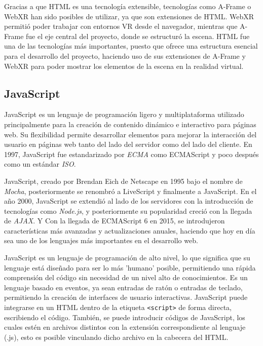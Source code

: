 \documentclass[a4paper, 12pt]{book}
\begin{document}
Gracias a que HTML es una tecnología extensible, tecnologías como A-Frame o WebXR han sido posibles de utilizar, ya que son extensiones de HTML. WebXR permitió poder trabajar con entornos VR desde el navegador, mientras que A-Frame fue el eje central 
del proyecto, donde se estructuró la escena. HTML fue una de las tecnologías más importantes, puesto que ofrece una estructura esencial para el desarrollo del proyecto, haciendo uso de sus extensiones de A-Frame y WebXR para poder mostrar los elementos de la escena en la realidad virtual.

\subsection{JavaScript}
\label{subsec:JavaScript}
JavaScript \cite{mdn2024} es un lenguaje de programación ligero y multiplataforma utilizado principalmente para la creación de contenido dinámico e interactivo para páginas web.
Su flexibilidad permite desarrollar elementos para mejorar la interacción del usuario en páginas web tanto del lado del servidor como del lado del cliente. En 1997, JavaScript fue estandarizado
por \textit{ECMA} como ECMAScript y poco después como un estándar \textit{ISO}.

JavaScript, creado por Brendan Eich de Netscape en 1995 bajo el nombre de \textit{Mocha}, posteriormente se renombró a LiveScript y finalmente a JavaScript.
En el año 2000, JavaScript se extendió al lado de los servidores con la introducción de tecnologías como \textit{Node.js}, y posteriormente su popularidad creció con la llegada de \textit{AJAX}. Y Con la llegada de ECMAScript 6 en 2015, se introdujeron características más avanzadas y
actualizaciones anuales, haciendo que hoy en día sea uno de los lenguajes más importantes en el desarrollo web.

JavaScript es un lenguaje de programación de alto nivel, lo que significa que su lenguaje está diseñado para ser lo más 'humano' posible, permitiendo una rápida comprensión del código sin necesidad de un nivel alto de conocimientos.
Es un lenguaje basado en eventos, ya sean entradas de ratón o entradas de teclado, permitiendo la creación de interfaces de usuario interactivas. JavaScript puede integrarse en un HTML dentro de la etiqueta \texttt{<script>} de forma directa, escribiendo el código.
También, se puede introducir códigos de JavaScript, los cuales estén en archivos distintos con la extensión correspondiente al lenguaje (.js), esto es posible vinculando dicho archivo en la cabecera del HTML.
\end{document}
